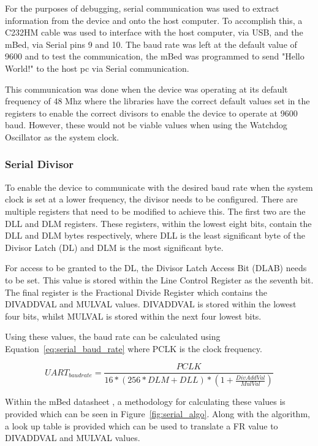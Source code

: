 For the purposes of debugging, serial communication was used to extract information from the device and onto the host computer. To accomplish this, a C232HM cable \cite{c232hm_datasheet} was used to interface with the host computer, via USB, and the mBed, via Serial pins 9 and 10. The baud rate was left at the default value of 9600 and to test the communication, the mBed was programmed to send "Hello World!" to the host pc via Serial communication.

This communication was done when the device was operating at its default frequency of 48 Mhz where the libraries have the correct default values set in the registers to enable the correct divisors to enable the device to operate at 9600 baud. However, these would not be viable values when using the Watchdog Oscillator as the system clock.

\subsubsection{Serial Divisor}

To enable the device to communicate with the desired baud rate when the system clock is set at a lower frequency, the divisor needs to be configured. There are multiple registers that need to be modified to achieve this. The first two are the DLL and DLM registers. These registers, within the lowest eight bits, contain the DLL and DLM bytes respectively, where DLL is the least significant byte of the Divisor Latch (DL) and DLM is the most significant byte.

For access to be granted to the DL, the Divisor Latch Access Bit (DLAB) needs to be set. This value is stored within the Line Control Register as the seventh bit. The final register is the Fractional Divide Register which contains the DIVADDVAL and MULVAL values. DIVADDVAL is stored within the lowest four bits, whilst MULVAL is stored within the next four lowest bits. 

Using these values, the baud rate can be calculated using Equation~\ref{eq:serial_baud_rate} where PCLK is the clock frequency\cite{mbed_datasheet}.

\begin{equation}
	\label{eq:serial_baud_rate}
	UART_{baud rate} = \frac{PCLK}{16 * (256 * DLM + DLL) * (1 + \frac{DivAddVal}{MulVal})}
\end{equation}

Within the mBed datasheet \cite{mbed_datasheet}, a methodology for calculating these values is provided which can be seen in Figure~\ref{fig:serial_algo}. Along with the algorithm, a look up table is provided which can be used to translate a FR value to DIVADDVAL and MULVAL values. 

